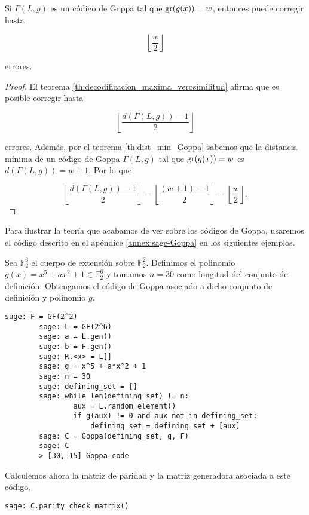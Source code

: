 \begin{corollary}
    Si $\Gamma(L,g)$ es un código de Goppa tal que $\operatorname{gr}(g(x)) = w$, entonces puede corregir hasta

    $$\left\lfloor \frac{w}{2} \right\rfloor $$

    errores.
\end{corollary}

\begin{proof}
    El teorema \ref{th:decodificacion_maxima_verosimilitud} afirma que es posible corregir hasta 
    
    $$\left\lfloor \frac{d(\Gamma(L,g)) - 1}{2} \right\rfloor$$

    errores. Además, por el teorema \ref{th:dist_min_Goppa} sabemos que la distancia mínima de un código de Goppa $\Gamma(L,g)$ tal que $\operatorname{gr}(g(x)) = w$ es $d(\Gamma(L,g)) = w + 1$. Por lo que

    $$\left\lfloor \frac{d(\Gamma(L,g)) - 1}{2} \right\rfloor = \left\lfloor \frac{(w + 1) - 1}{2} \right\rfloor = \left\lfloor \frac{w}{2} \right\rfloor .$$
\end{proof}

Para ilustrar la teoría que acabamos de ver sobre los códigos de Goppa, usaremos el código descrito en el apéndice \ref{annex:sage-Goppa} en los siguientes ejemplos.

\begin{exampleth}
    Sea $\mathbb{F}_2^6$ el cuerpo de extensión sobre $\mathbb{F}_2^2$. Definimos el polinomio $g(x) = x^5 + ax^2 + 1 \in \mathbb{F}_2^6$ y tomamos $n = 30$ como longitud del conjunto de definición. Obtengamos el código de Goppa asociado a dicho conjunto de definición y polinomio $g$.
    \begin{lstlisting}[gobble=4]
        sage: F = GF(2^2)
        sage: L = GF(2^6)
        sage: a = L.gen()
        sage: b = F.gen()
        sage: R.<x> = L[]
        sage: g = x^5 + a*x^2 + 1
        sage: n = 30
        sage: defining_set = []
        sage: while len(defining_set) != n:
                aux = L.random_element()
                if g(aux) != 0 and aux not in defining_set:
                    defining_set = defining_set + [aux]
        sage: C = Goppa(defining_set, g, F)
        sage: C
        > [30, 15] Goppa code
    \end{lstlisting}
    Calculemos ahora la matriz de paridad y la matriz generadora asociada a este código.
    \begin{lstlisting}[gobble=4]
        sage: C.parity_check_matrix()
    \end{lstlisting}
\end{exampleth}

